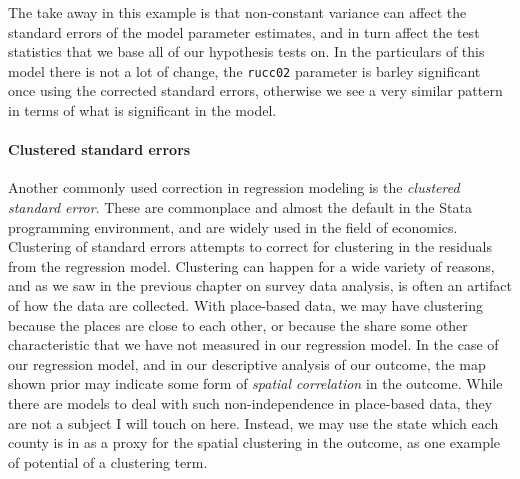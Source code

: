 \documentclass[
]{article}
\newenvironment{Shaded}{\begin{snugshade}}{\end{snugshade}}
\newcommand{\AttributeTok}[1]{\textcolor[rgb]{0.77,0.63,0.00}{#1}}
\newcommand{\FunctionTok}[1]{\textcolor[rgb]{0.00,0.00,0.00}{#1}}
\newcommand{\NormalTok}[1]{#1}
\newcommand{\SpecialCharTok}[1]{\textcolor[rgb]{0.00,0.00,0.00}{#1}}
\begin{document}
The take away in this example is that non-constant variance can affect the standard errors of the model parameter estimates, and in turn affect the test statistics that we base all of our hypothesis tests on. In the particulars of this model there is not a lot of change, the \texttt{rucc02} parameter is barley significant once using the corrected standard errors, otherwise we see a very similar pattern in terms of what is significant in the model.

\hypertarget{clustered-standard-errors}{%
\paragraph{Clustered standard errors}\label{clustered-standard-errors}}

Another commonly used correction in regression modeling is the \emph{clustered standard error}. These are commonplace and almost the default in the Stata programming environment, and are widely used in the field of economics. Clustering of standard errors attempts to correct for clustering in the residuals from the regression model. Clustering can happen for a wide variety of reasons, and as we saw in the previous chapter on survey data analysis, is often an artifact of how the data are collected. With place-based data, we may have clustering because the places are close to each other, or because the share some other characteristic that we have not measured in our regression model. In the case of our regression model, and in our descriptive analysis of our outcome, the map shown prior may indicate some form of \emph{spatial correlation} in the outcome. While there are models to deal with such non-independence in place-based data, they are not a subject I will touch on here. Instead, we may use the state which each county is in as a proxy for the spatial clustering in the outcome, as one example of potential of a clustering term.

\begin{Shaded}
\end{Shaded}
\end{document}
